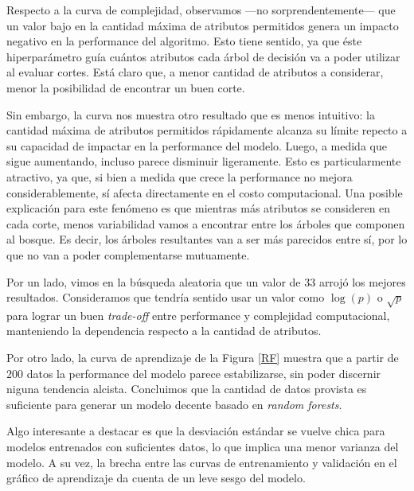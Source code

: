 Respecto a la curva de complejidad, observamos ---no sorprendentemente--- que un valor bajo en la cantidad máxima de atributos permitidos genera un impacto negativo en la performance del algoritmo. Esto tiene sentido, ya que éste hiperparámetro guía cuántos atributos cada árbol de decisión va a poder utilizar al evaluar cortes. Está claro que, a menor cantidad de atributos a considerar, menor la posibilidad de encontrar un buen corte.

Sin embargo, la curva nos muestra otro resultado que es menos intuitivo: la cantidad máxima de atributos permitidos rápidamente alcanza su límite repecto a su capacidad de impactar en la performance del modelo. Luego, a medida que sigue aumentando, incluso parece disminuir ligeramente. Esto es particularmente atractivo, ya que, si bien a medida que crece la performance no mejora considerablemente, sí afecta directamente en el costo computacional. Una posible explicación para este fenómeno es que mientras más atributos se consideren en cada corte, menos variabilidad vamos a encontrar entre los árboles que componen al bosque. Es decir, los árboles resultantes van a ser más parecidos entre sí, por lo que no van a poder complementarse mutuamente.  

Por un lado, vimos en la búsqueda aleatoria que un valor de $33$ arrojó los mejores resultados. Consideramos que tendría sentido usar un valor como $\log(p)$ o $\sqrt{p}$ para lograr un buen \textit{trade-off} entre performance y complejidad computacional, manteniendo la dependencia respecto a la cantidad de atributos.   

Por otro lado, la curva de aprendizaje de la Figura \ref{RF} muestra que a partir de $200$ datos la performance del modelo parece estabilizarse, sin poder discernir niguna tendencia alcista. Concluimos que la cantidad de datos provista es suficiente para generar un modelo decente basado en \textit{random forests}. 

Algo interesante a destacar es que la desviación estándar se vuelve chica para modelos entrenados con suficientes datos, lo que implica una menor varianza del modelo. A su vez, la brecha entre las curvas de entrenamiento y validación en el gráfico de aprendizaje da cuenta de un leve sesgo del modelo.
